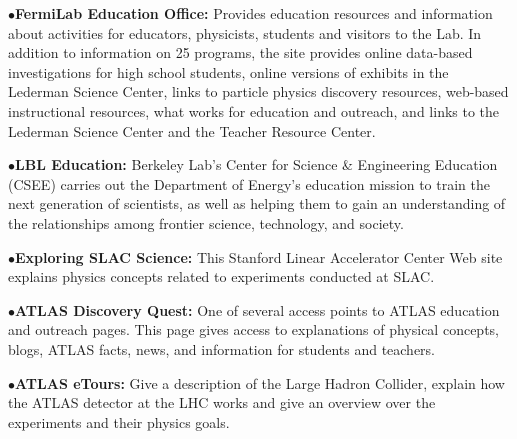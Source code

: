 \medskip

\item{$\bullet$}{\bf FermiLab Education Office:} 
Provides  education resources and information about activities for educators, physicists, students and visitors to the Lab. In addition to information on 25 programs, the site  provides online data-based investigations for high school students, online versions of exhibits in the Lederman Science Center, links to particle physics discovery resources, web-based instructional resources, what works for education and outreach, and links to the Lederman Science Center and the Teacher Resource Center.
	\item{}

\medskip

\item{$\bullet$}{\bf LBL Education:} 
Berkeley Lab's Center for Science \& Engineering Education (CSEE) carries out the Department of Energy’s education mission to train the next generation of scientists, as well as helping them to gain an understanding of the relationships among frontier science, technology, and society.
	\item{}

\medskip

\item{$\bullet$}{\bf Exploring SLAC Science:}
This Stanford Linear Accelerator Center Web site explains physics concepts related to experiments conducted at SLAC.
	\item{}



\medskip
\medskip



\medskip

\item{$\bullet$}{\bf ATLAS Discovery Quest:} 
One of several access points to ATLAS education and outreach pages. This page gives access to explanations of physical concepts, blogs, ATLAS facts, news, and information for students and teachers.
   \item{}     


\item{$\bullet$}{\bf ATLAS eTours:} 
Give a description of the Large Hadron Collider, explain how the ATLAS detector at the LHC works and give an overview over the experiments and their physics goals. 
	\item{}

